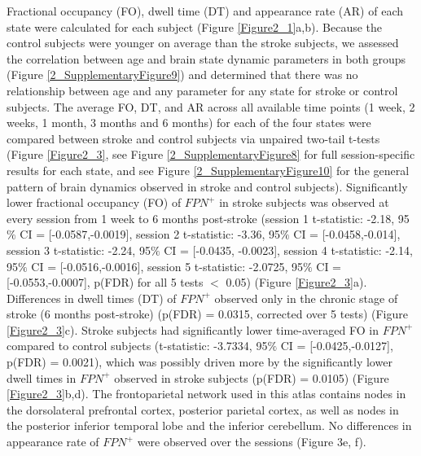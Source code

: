 \documentclass[phd,tocprelim]{cornell}
\begin{document}
    Fractional occupancy (FO), dwell time (DT) and appearance rate (AR) of each state were calculated for each subject (Figure \ref{Figure2_1}a,b). Because the control subjects were younger on average than the stroke subjects, we assessed the correlation between age and brain state dynamic parameters in both groups (Figure \ref{2_SupplementaryFigure9}) and determined that there was no relationship between age and any parameter for any state for stroke or control subjects. The average FO, DT, and AR across all available time points (1 week, 2 weeks, 1 month, 3 months and 6 months) for each of the four states were compared between stroke and control subjects via unpaired two-tail t-tests (Figure \ref{Figure2_3}, see Figure \ref{2_SupplementaryFigure8} for full session-specific results for each state, and see Figure  \ref{2_SupplementaryFigure10} for the general pattern of brain dynamics observed in stroke and control subjects). Significantly lower fractional occupancy (FO) of $FPN^+$ in stroke subjects was observed at every session from 1 week to 6 months post-stroke (session 1 t-statistic: -2.18, 95$\%$ CI = [-0.0587,-0.0019], session 2 t-statistic: -3.36, 95$\%$ CI = [-0.0458,-0.014], session 3 t-statistic: -2.24, 95$\%$ CI = [-0.0435, -0.0023], session 4 t-statistic: -2.14, 95$\%$ CI = [-0.0516,-0.0016], session 5 t-statistic: -2.0725, 95$\%$ CI = [-0.0553,-0.0007], p(FDR) for all 5 tests $<$ 0.05) (Figure \ref{Figure2_3}a). Differences in dwell times (DT) of $FPN^+$ observed only in the chronic stage of stroke (6 months post-stroke) (p(FDR) = 0.0315, corrected over 5 tests) (Figure \ref{Figure2_3}c). Stroke subjects had significantly lower time-averaged FO in $FPN^+$ compared to control subjects (t-statistic: -3.7334,  95$\%$ CI = [-0.0425,-0.0127], p(FDR) = 0.0021), which was possibly driven more by the significantly lower dwell times in $FPN^+$ observed in stroke subjects (p(FDR) = 0.0105) (Figure \ref{Figure2_3}b,d). The frontoparietal network used in this atlas contains nodes in the dorsolateral prefrontal cortex, posterior parietal cortex, as well as nodes in the posterior inferior temporal lobe and the inferior cerebellum.  No differences in appearance rate of $FPN^+$ were observed over the sessions (Figure 3e, f).
\end{document}
